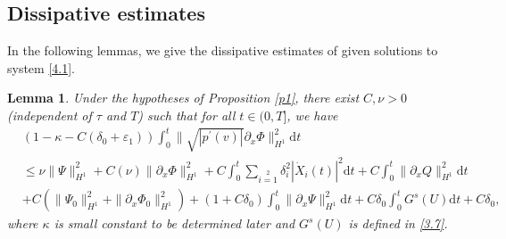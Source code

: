\documentclass[10pt,reqno]{amsart}
\numberwithin{equation}{section}
\newtheorem{lemma}[theorem]{Lemma}
\newcommand{\dif}{\mathrm{d}}
\begin{document}
\subsection{Dissipative estimates}
In the following lemmas, we give the dissipative estimates of given solutions to system \eqref{4.1}.
\begin{lemma}\label{Le4.8}
Under the hypotheses of Proposition \ref{p1}, there exist $C,\nu>0$ (independent of $\tau$ and $T$) such that for all $t\in(0,T]$, we have
\begin{equation}\label{26.3}
\begin{aligned}
&(1-\kappa-C(\delta_0+\varepsilon_1))\int_0^t\|\sqrt{|p^\prime(v)|}\partial_{x}\Phi\|_{H^1}^2\dif t\\
&\leq\nu\|\Psi\|_{H^1}^2
+C(\nu)\|\partial_{x}\Phi\|_{H^1}^2
     +C\int_0^t\sum\limits_{i=1}\limits^2\delta_i^2|\dot{X}_i(t)|^2\dif t+C\int_0^t\|\partial_{x}Q\|_{H^1}^2\dif t\\
     &+C\left(\|\Psi_0\|_{H^1}^2+\|\partial_{x}\Phi_0\|_{H^1}^2\right)
     +(1+C\delta_0)\int_0^t\|\partial_{x}\Psi\|_{H^1}^2\dif t
     +C\delta_0\int_0^tG^s(U)\dif t+C\delta_0,
\end{aligned}
\end{equation}
where $\kappa$ is small constant to be determined later and $G^s(U)$ is defined in \eqref{3.7}.
\end{lemma}
\end{document}
